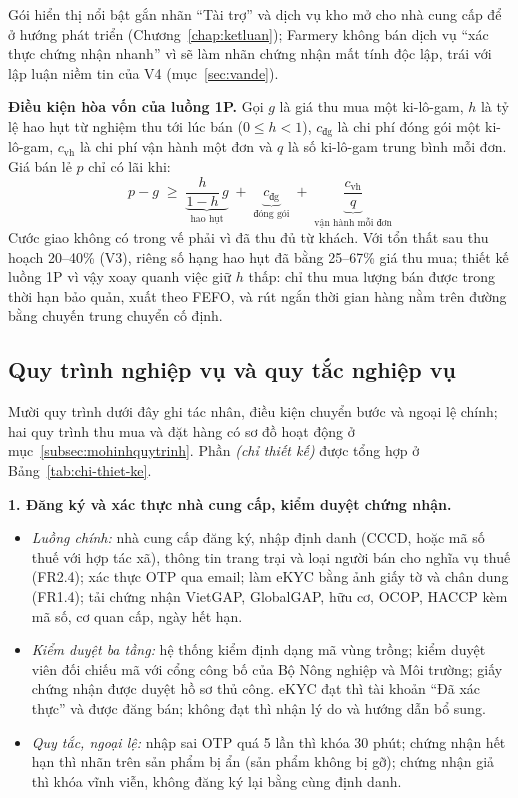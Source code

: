 Gói hiển thị nổi bật gắn nhãn ``Tài trợ'' và dịch vụ kho mở cho nhà cung cấp để ở hướng phát triển (Chương~\ref{chap:ketluan}); Farmery không bán dịch vụ ``xác thực chứng nhận nhanh'' vì sẽ làm nhãn chứng nhận mất tính độc lập, trái với lập luận niềm tin của V4 (mục~\ref{sec:vande}).

\noindent\textbf{Điều kiện hòa vốn của luồng 1P.} Gọi $g$ là giá thu mua một ki-lô-gam, $h$ là tỷ lệ hao hụt từ nghiệm thu tới lúc bán ($0 \le h < 1$), $c_{\text{đg}}$ là chi phí đóng gói một ki-lô-gam, $c_{\text{vh}}$ là chi phí vận hành một đơn và $q$ là số ki-lô-gam trung bình mỗi đơn. Giá bán lẻ $p$ chỉ có lãi khi:
\[
p - g \;\ge\; \underbrace{\frac{h}{1-h}\,g}_{\text{hao hụt}} \;+\; \underbrace{c_{\text{đg}}}_{\text{đóng gói}} \;+\; \underbrace{\frac{c_{\text{vh}}}{q}}_{\text{vận hành mỗi đơn}}
\]
Cước giao không có trong vế phải vì đã thu đủ từ khách. Với tổn thất sau thu hoạch 20--40\% (V3), riêng số hạng hao hụt đã bằng 25--67\% giá thu mua; thiết kế luồng 1P vì vậy xoay quanh việc giữ $h$ thấp: chỉ thu mua lượng bán được trong thời hạn bảo quản, xuất theo FEFO, và rút ngắn thời gian hàng nằm trên đường bằng chuyến trung chuyển cố định.

\subsection{Quy trình nghiệp vụ và quy tắc nghiệp vụ}
\label{sec:quytrinhnghiepvu}

Mười quy trình dưới đây ghi tác nhân, điều kiện chuyển bước và ngoại lệ chính; hai quy trình thu mua và đặt hàng có sơ đồ hoạt động ở mục~\ref{subsec:mohinhquytrinh}. Phần \emph{(chỉ thiết kế)} được tổng hợp ở Bảng~\ref{tab:chi-thiet-ke}.

\noindent\textbf{1. Đăng ký và xác thực nhà cung cấp, kiểm duyệt chứng nhận.}
\begin{itemize}
    \item \emph{Luồng chính:} nhà cung cấp đăng ký, nhập định danh (CCCD, hoặc mã số thuế với hợp tác xã), thông tin trang trại và loại người bán cho nghĩa vụ thuế (FR2.4); xác thực OTP qua email; làm eKYC bằng ảnh giấy tờ và chân dung (FR1.4); tải chứng nhận VietGAP, GlobalGAP, hữu cơ, OCOP, HACCP kèm mã số, cơ quan cấp, ngày hết hạn.
    \item \emph{Kiểm duyệt ba tầng:} hệ thống kiểm định dạng mã vùng trồng; kiểm duyệt viên đối chiếu mã với cổng công bố của Bộ Nông nghiệp và Môi trường; giấy chứng nhận được duyệt hồ sơ thủ công. eKYC đạt thì tài khoản ``Đã xác thực'' và được đăng bán; không đạt thì nhận lý do và hướng dẫn bổ sung.
    \item \emph{Quy tắc, ngoại lệ:} nhập sai OTP quá 5 lần thì khóa 30 phút; chứng nhận hết hạn thì nhãn trên sản phẩm bị ẩn (sản phẩm không bị gỡ); chứng nhận giả thì khóa vĩnh viễn, không đăng ký lại bằng cùng định danh.
\end{itemize}

